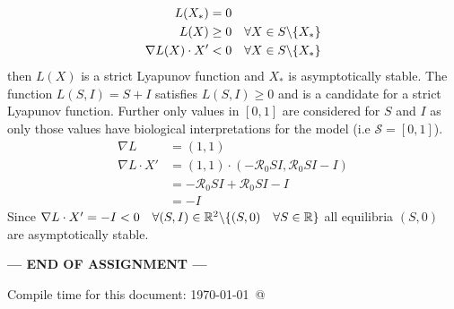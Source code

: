\documentclass[12pt]{article}
\begin{document}
\begin{enumerate}[(a)]
\begin{align*}
    L(X_*) &= 0\\
    L(X) &\geq 0\quad \forall X \in S\char`\\ \{X_*\}\\
    \nabla L(X) \cdot X' &< 0 \quad \forall X \in S\char`\\ \{X_*\}
\end{align*}
then $L(X)$ is a strict Lyapunov function and $X_*$ is asymptotically stable.
The function $L(S,I) = S + I$ satisfies $L(S,I) \geq 0$ and is a candidate for a strict Lyapunov function.
Further only values in $[0,1]$ are considered for $S$ and $I$ as only those values have biological interpretations for the model (i.e ${\mathcal S} = [0,1]$).
\begin{align*}
    \nabla L &= (1,1)\\
    \nabla L \cdot X' &= (1,1)\cdot(-{\mathcal R_0}SI,{\mathcal R_0}SI-I)\\
    &=-{\mathcal R_0}SI + {\mathcal R_0}SI-I\\
    &=-I
\end{align*}
Since $\nabla L \cdot X' = -I < 0\quad \forall (S,I) \in \mathbb{R}^2\char`\\ \{(S,0)\quad \forall S \in \mathbb{R}\}$ all equilibria $(S,0)$ are asymptotically stable.
\end{enumerate}
\centerline{\bf--- END OF ASSIGNMENT ---}
\bigskip
Compile time for this document:
\today\ @ \thistime
\end{document}
